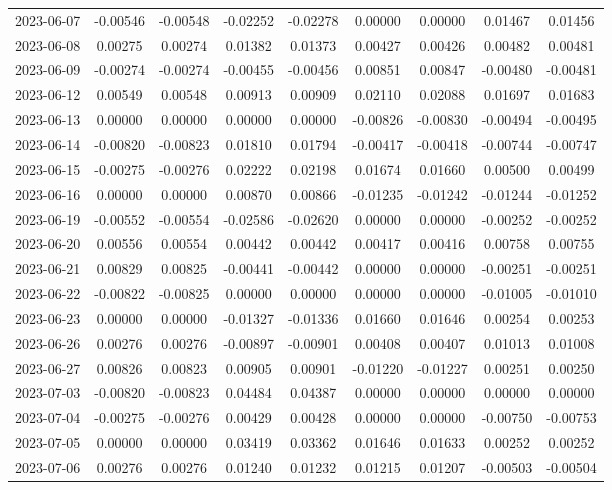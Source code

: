 {\begin{footnotesize}
\begin{longtable}{lcccccccc}
2023-06-07 & -0.00546 & -0.00548 & -0.02252 & -0.02278 & 0.00000 & 0.00000 & 0.01467 & 0.01456 \\
2023-06-08 & 0.00275 & 0.00274 & 0.01382 & 0.01373 & 0.00427 & 0.00426 & 0.00482 & 0.00481 \\
2023-06-09 & -0.00274 & -0.00274 & -0.00455 & -0.00456 & 0.00851 & 0.00847 & -0.00480 & -0.00481 \\
2023-06-12 & 0.00549 & 0.00548 & 0.00913 & 0.00909 & 0.02110 & 0.02088 & 0.01697 & 0.01683 \\
2023-06-13 & 0.00000 & 0.00000 & 0.00000 & 0.00000 & -0.00826 & -0.00830 & -0.00494 & -0.00495 \\
2023-06-14 & -0.00820 & -0.00823 & 0.01810 & 0.01794 & -0.00417 & -0.00418 & -0.00744 & -0.00747 \\
2023-06-15 & -0.00275 & -0.00276 & 0.02222 & 0.02198 & 0.01674 & 0.01660 & 0.00500 & 0.00499 \\
2023-06-16 & 0.00000 & 0.00000 & 0.00870 & 0.00866 & -0.01235 & -0.01242 & -0.01244 & -0.01252 \\
2023-06-19 & -0.00552 & -0.00554 & -0.02586 & -0.02620 & 0.00000 & 0.00000 & -0.00252 & -0.00252 \\
2023-06-20 & 0.00556 & 0.00554 & 0.00442 & 0.00442 & 0.00417 & 0.00416 & 0.00758 & 0.00755 \\
2023-06-21 & 0.00829 & 0.00825 & -0.00441 & -0.00442 & 0.00000 & 0.00000 & -0.00251 & -0.00251 \\
2023-06-22 & -0.00822 & -0.00825 & 0.00000 & 0.00000 & 0.00000 & 0.00000 & -0.01005 & -0.01010 \\
2023-06-23 & 0.00000 & 0.00000 & -0.01327 & -0.01336 & 0.01660 & 0.01646 & 0.00254 & 0.00253 \\
2023-06-26 & 0.00276 & 0.00276 & -0.00897 & -0.00901 & 0.00408 & 0.00407 & 0.01013 & 0.01008 \\
2023-06-27 & 0.00826 & 0.00823 & 0.00905 & 0.00901 & -0.01220 & -0.01227 & 0.00251 & 0.00250 \\
2023-07-03 & -0.00820 & -0.00823 & 0.04484 & 0.04387 & 0.00000 & 0.00000 & 0.00000 & 0.00000 \\
2023-07-04 & -0.00275 & -0.00276 & 0.00429 & 0.00428 & 0.00000 & 0.00000 & -0.00750 & -0.00753 \\
2023-07-05 & 0.00000 & 0.00000 & 0.03419 & 0.03362 & 0.01646 & 0.01633 & 0.00252 & 0.00252 \\
2023-07-06 & 0.00276 & 0.00276 & 0.01240 & 0.01232 & 0.01215 & 0.01207 & -0.00503 & -0.00504 \\

\end{longtable}
\end{footnotesize}}
